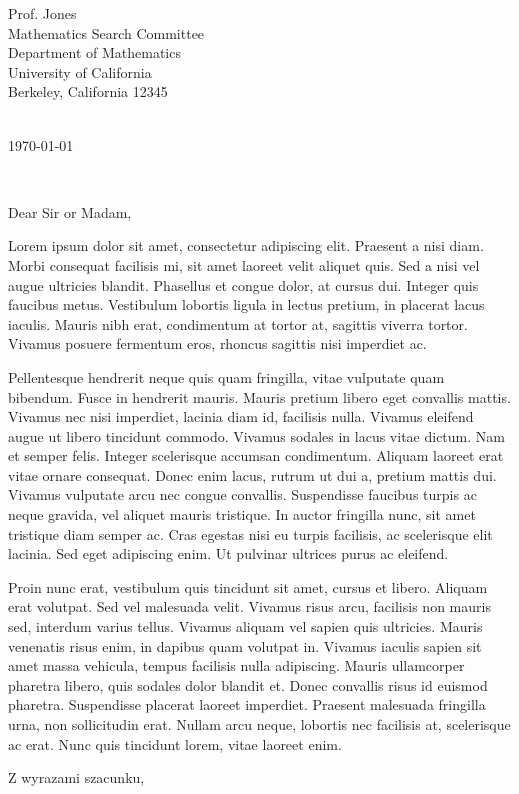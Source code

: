 \documentclass[11pt,a4paper]{letter}
\def\opening#1{\thispagestyle{empty}
{\centering\fromaddress \vspace{0.6in} \\
\hspace*{\longindentation}\today\hspace*{\fill}\par}
{\raggedright \toname \\ \toaddress \par}
\vspace{0.4in}
\noindent #1
}
\begin{document}

\begin{letter}
{Prof. Jones\\
Mathematics Search Committee\\
Department of Mathematics\\
University of California\\
Berkeley, California 12345\\
}


\opening{Dear Sir or Madam,}

Lorem ipsum dolor sit amet, consectetur adipiscing elit. Praesent a nisi diam. Morbi consequat facilisis mi, sit amet laoreet velit aliquet quis. Sed a nisi vel augue ultricies blandit. Phasellus et congue dolor, at cursus dui. Integer quis faucibus metus. Vestibulum lobortis ligula in lectus pretium, in placerat lacus iaculis. Mauris nibh erat, condimentum at tortor at, sagittis viverra tortor. Vivamus posuere fermentum eros, rhoncus sagittis nisi imperdiet ac.

Pellentesque hendrerit neque quis quam fringilla, vitae vulputate quam bibendum. Fusce in hendrerit mauris. Mauris pretium libero eget convallis mattis. Vivamus nec nisi imperdiet, lacinia diam id, facilisis nulla. Vivamus eleifend augue ut libero tincidunt commodo. Vivamus sodales in lacus vitae dictum. Nam et semper felis. Integer scelerisque accumsan condimentum. Aliquam laoreet erat vitae ornare consequat. Donec enim lacus, rutrum ut dui a, pretium mattis dui. Vivamus vulputate arcu nec congue convallis. Suspendisse faucibus turpis ac neque gravida, vel aliquet mauris tristique. In auctor fringilla nunc, sit amet tristique diam semper ac. Cras egestas nisi eu turpis facilisis, ac scelerisque elit lacinia. Sed eget adipiscing enim. Ut pulvinar ultrices purus ac eleifend.

Proin nunc erat, vestibulum quis tincidunt sit amet, cursus et libero. Aliquam erat volutpat. Sed vel malesuada velit. Vivamus risus arcu, facilisis non mauris sed, interdum varius tellus. Vivamus aliquam vel sapien quis ultricies. Mauris venenatis risus enim, in dapibus quam volutpat in. Vivamus iaculis sapien sit amet massa vehicula, tempus facilisis nulla adipiscing. Mauris ullamcorper pharetra libero, quis sodales dolor blandit et. Donec convallis risus id euismod pharetra. Suspendisse placerat laoreet imperdiet. Praesent malesuada fringilla urna, non sollicitudin erat. Nullam arcu neque, lobortis nec facilisis at, scelerisque ac erat. Nunc quis tincidunt lorem, vitae laoreet enim.

\closing{Z wyrazami szacunku,}


\end{letter}
\end{document}
